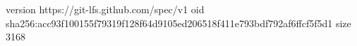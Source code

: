 version https://git-lfs.github.com/spec/v1
oid sha256:acc93f100155f79319f128f64d9105ed206518f411e793bdf792af6ffcf5f5d1
size 3168
